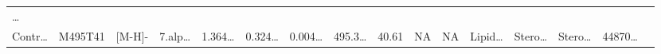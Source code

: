 \documentclass[
]{article}
\begin{document}
\begin{longtable}[]{@{}llllllllllllllll@{}}
\begin{minipage}[t]{0.02\columnwidth}
\ldots{}\strut
\end{minipage}\tabularnewline
\begin{minipage}[t]{0.04\columnwidth}\raggedright
Contr\ldots{}\strut
\end{minipage} & \begin{minipage}[t]{0.04\columnwidth}\raggedright
M495T41\strut
\end{minipage} & \begin{minipage}[t]{0.04\columnwidth}\raggedright
{[}M-H{]}-\strut
\end{minipage} & \begin{minipage}[t]{0.04\columnwidth}\raggedright
7.alp\ldots{}\strut
\end{minipage} & \begin{minipage}[t]{0.04\columnwidth}\raggedright
1.364\ldots{}\strut
\end{minipage} & \begin{minipage}[t]{0.04\columnwidth}\raggedright
0.324\ldots{}\strut
\end{minipage} & \begin{minipage}[t]{0.04\columnwidth}\raggedright
0.004\ldots{}\strut
\end{minipage} & \begin{minipage}[t]{0.04\columnwidth}\raggedright
495.3\ldots{}\strut
\end{minipage} & \begin{minipage}[t]{0.04\columnwidth}\raggedright
40.61\strut
\end{minipage} & \begin{minipage}[t]{0.04\columnwidth}\raggedright
NA\strut
\end{minipage} & \begin{minipage}[t]{0.03\columnwidth}\raggedright
NA\strut
\end{minipage} & \begin{minipage}[t]{0.04\columnwidth}\raggedright
Lipid\ldots{}\strut
\end{minipage} & \begin{minipage}[t]{0.04\columnwidth}\raggedright
Stero\ldots{}\strut
\end{minipage} & \begin{minipage}[t]{0.04\columnwidth}\raggedright
Stero\ldots{}\strut
\end{minipage} & \begin{minipage}[t]{0.04\columnwidth}\raggedright
44870\ldots{}\strut
\end{minipage} & \begin{minipage}[t]{0.02\columnwidth}\raggedright

\end{minipage}
\end{longtable}
\end{document}
